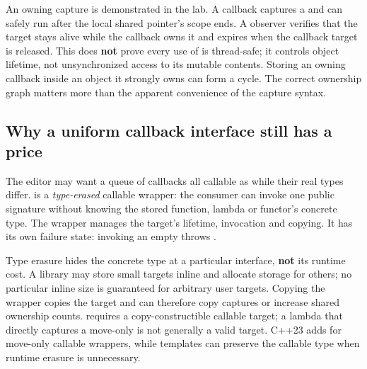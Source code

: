 An owning capture is demonstrated in the lab. A callback captures a  and can safely run after the local shared pointer's scope ends. A  observer verifies that the target stays alive while the callback owns it and expires when the callback target is released. This does \textbf{not} prove every use of  is thread-safe; it controls object lifetime, not unsynchronized access to its mutable contents. Storing an owning callback inside an object it strongly owns can form a cycle. The correct ownership graph matters more than the apparent convenience of the capture syntax.

\subsection{Why a uniform callback interface still has a price}\label{01-foundations-i-ch004-why-a-uniform-callback-interface-still-has-a-price}

\hypertarget{01-foundations-i-ch004-why-a-uniform-callback-interface-still-has-a-price}{}

The editor may want a queue of callbacks all callable as  while their real types differ.  is a \emph{type-erased} callable wrapper: the consumer can invoke one public signature without knowing the stored function, lambda or functor's concrete type. The wrapper manages the target's lifetime, invocation and copying. It has its own failure state: invoking an empty  throws .

Type erasure hides the concrete type at a particular interface, \textbf{not} its runtime cost. A library may store small targets inline and allocate storage for others; no particular inline size is guaranteed for arbitrary user targets. Copying the wrapper copies the target and can therefore copy captures or increase shared ownership counts.  requires a copy-constructible callable target; a lambda that directly captures a move-only  is not generally a valid target. C++23 adds  for move-only callable wrappers, while templates can preserve the callable type when runtime erasure is unnecessary.

